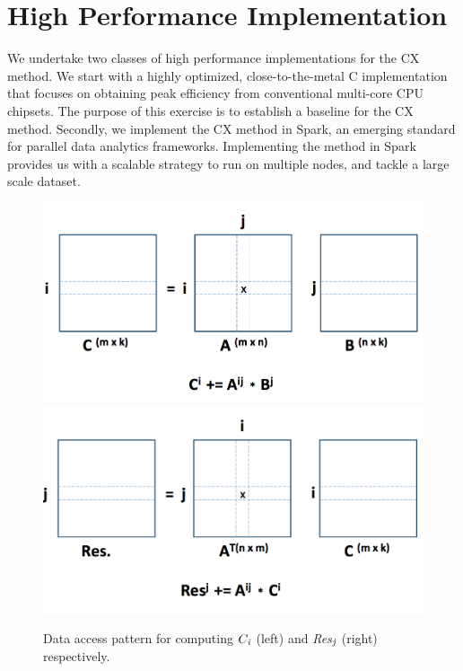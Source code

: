 \section{High Performance Implementation}

We undertake two classes of high performance implementations for the CX method. We start with a highly optimized, close-to-the-metal C implementation that focuses on obtaining peak efficiency from conventional multi-core CPU chipsets. The purpose of this exercise is to establish a baseline for the CX method. Secondly, we implement the CX method in Spark, an emerging standard for parallel data analytics frameworks. Implementing the method in Spark provides us with a scalable strategy to run on multiple nodes, and tackle a large scale dataset. 


\label{sec:implementation}

     \begin{figure}[htp]
         \includegraphics[scale=0.254]{images/jatin_a}
         \includegraphics[scale=0.254]{images/jatin_b}
         \caption{ Data access pattern for computing ${C}_{\it{i}}$ (left) and {\it{Res}}$_{\it{j}}$ (right) respectively.}
         \label{fig:access_pattern}
           \end{figure}


